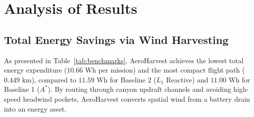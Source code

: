 \documentclass[12pt,a4paper,oneside]{report}
\begin{document}
\begin{table}[H]
    \centering
    \caption{Comprehensive 30-Run Monte Carlo Benchmark Results across Baselines, Ablations, and AeroHarvest.}
    \label{tab:benchmarks}
\end{table}

\section{Analysis of Results}
\subsection{Total Energy Savings via Wind Harvesting}
As presented in Table~\ref{tab:benchmarks}, AeroHarvest achieves the lowest total energy expenditure ($10.66\text{ Wh}$ per mission) and the most compact flight path ($0.449\text{ km}$), compared to $11.59\text{ Wh}$ for Baseline 2 ($L_1$ Reactive) and $11.00\text{ Wh}$ for Baseline 1 ($A^*$). By routing through canyon updraft channels and avoiding high-speed headwind pockets, AeroHarvest converts spatial wind from a battery drain into an energy asset.
\end{document}
